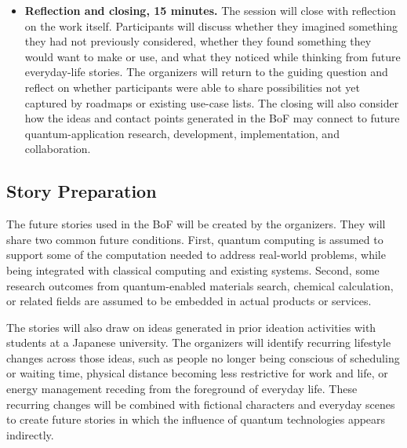 \documentclass[10pt,conference]{IEEEtran}
\begin{document}
\begin{itemize}
\item \textbf{Reflection and closing, 15 minutes.} The session will close with reflection on the work itself. Participants will discuss whether they imagined something they had not previously considered, whether they found something they would want to make or use, and what they noticed while thinking from future everyday-life stories. The organizers will return to the guiding question and reflect on whether participants were able to share possibilities not yet captured by roadmaps or existing use-case lists. The closing will also consider how the ideas and contact points generated in the BoF may connect to future quantum-application research, development, implementation, and collaboration.
\end{itemize}

\subsection*{Story Preparation}

The future stories used in the BoF will be created by the organizers. They will share two common future conditions. First, quantum computing is assumed to support some of the computation needed to address real-world problems, while being integrated with classical computing and existing systems. Second, some research outcomes from quantum-enabled materials search, chemical calculation, or related fields are assumed to be embedded in actual products or services.

The stories will also draw on ideas generated in prior ideation activities with students at a Japanese university. The organizers will identify recurring lifestyle changes across those ideas, such as people no longer being conscious of scheduling or waiting time, physical distance becoming less restrictive for work and life, or energy management receding from the foreground of everyday life. These recurring changes will be combined with fictional characters and everyday scenes to create future stories in which the influence of quantum technologies appears indirectly.
\end{document}
